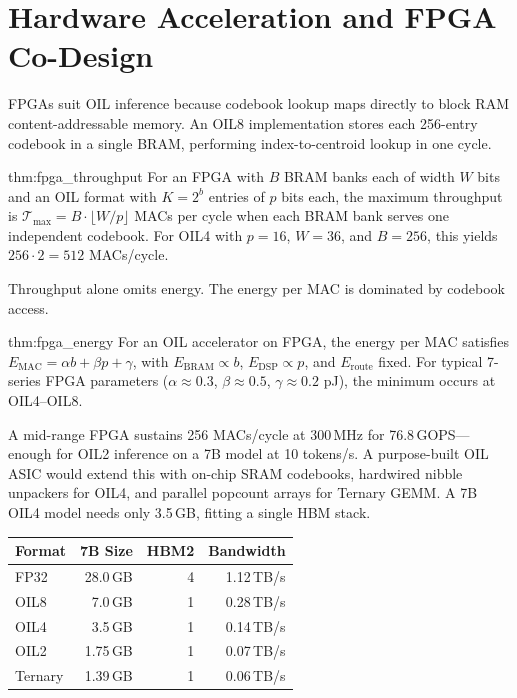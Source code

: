 \section{Hardware Acceleration and FPGA Co-Design}
\label{sec:hardware_accel}
FPGAs suit OIL inference because codebook lookup maps directly to block RAM
content-addressable memory. An OIL8 implementation stores each 256-entry
codebook in a single BRAM, performing index-to-centroid lookup in one cycle.
\begin{mythm}{thm:fpga_throughput}
For an FPGA with $B$ BRAM banks each of width $W$ bits and an OIL format
with $K = 2^b$ entries of $p$ bits each, the maximum throughput is
$\mathcal{T}_{\max} = B \cdot \lfloor W / p \rfloor$ MACs per cycle when
each BRAM bank serves one independent codebook. For OIL4 with $p = 16$,
$W = 36$, and $B = 256$, this yields $256 \cdot 2 = 512$ MACs/cycle.
\end{mythm}
Throughput alone omits energy. The energy per MAC is dominated by
codebook access.
\begin{mythm}{thm:fpga_energy}
For an OIL accelerator on FPGA, the energy per MAC satisfies
$E_{\text{MAC}} = \alpha b + \beta p + \gamma$, with $E_{\text{BRAM}} \propto
b$, $E_{\text{DSP}} \propto p$, and $E_{\text{route}}$ fixed. For typical
7-series FPGA parameters ($\alpha \approx 0.3$, $\beta \approx 0.5$,
$\gamma \approx 0.2$ pJ), the minimum occurs at OIL4--OIL8.
\end{mythm}
A mid-range FPGA sustains 256 MACs/cycle at 300\,MHz for 76.8\,GOPS---enough
for OIL2 inference on a 7B model at 10 tokens/s. A purpose-built OIL ASIC
would extend this with on-chip SRAM codebooks, hardwired nibble unpackers
for OIL4, and parallel popcount arrays for Ternary GEMM. A 7B OIL4 model
needs only 3.5\,GB, fitting a single HBM stack.
\begin{center}
\begin{tabular}{lrrr}
\toprule
\textbf{Format} & \textbf{7B Size} & \textbf{HBM2} &
\textbf{Bandwidth} \\
\midrule
FP32    & 28.0\,GB & 4 & 1.12\,TB/s \\
OIL8    &  7.0\,GB & 1 & 0.28\,TB/s \\
OIL4    &  3.5\,GB & 1 & 0.14\,TB/s \\
OIL2    &  1.75\,GB & 1 & 0.07\,TB/s \\
Ternary &  1.39\,GB & 1 & 0.06\,TB/s \\
\bottomrule
\end{tabular}
\end{center}

